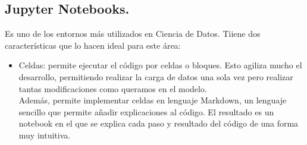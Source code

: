 \documentclass[a4paper,10pt]{article}
\begin{document}
\subsection{Jupyter Notebooks.}
Es uno de los entornos más utilizados en Ciencia de Datos. Tiiene dos características que lo hacen ideal para este área:
\begin{itemize}
\item  Celdas: permite ejecutar el código por celdas o bloques. Esto agiliza mucho el desarrollo, permitiendo realizar la carga de datos una sola vez pero realizar tantas modificaciones como queramos en el modelo.
\\Además, permite implementar celdas en lenguaje Markdown, un lenguaje sencillo que permite añadir explicaciones al código. El resultado es un notebook en el que se explica cada paso y resultado del código de una forma muy intuitiva.
\end{itemize}
\end{document}
